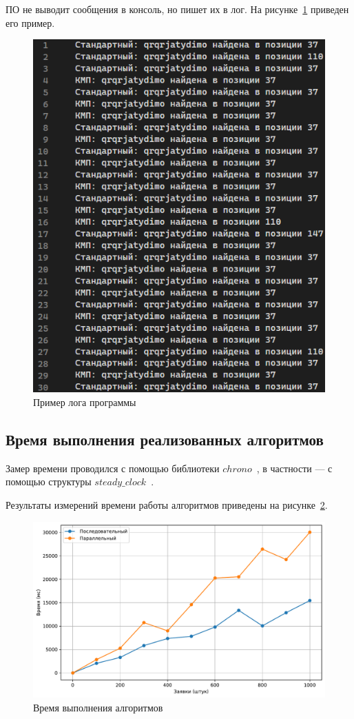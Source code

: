 ПО не выводит сообщения в консоль, но пишет их в лог.
На рисунке~\ref{fig:log_png} приведен его пример.
\begin{figure}
	\centering
	\includegraphics[width=0.7\linewidth]{images/log.png}
	\caption{Пример лога программы}
	\label{fig:log_png}
\end{figure}


\newpage

\subsection{Время выполнения реализованных алгоритмов}
Замер времени проводился с помощью библиотеки $chrono$~\cite{chrono}, в частности --- с помощью структуры $steady\_clock$~\cite{steady}.

Результаты измерений времени работы алгоритмов приведены на рисунке~\ref{fig:results}.
\begin{figure}
	\centering
	\includegraphics[width=1\linewidth]{../src/lab_05/time}
	\caption{Время выполнения алгоритмов}
	\label{fig:results}
\end{figure}

